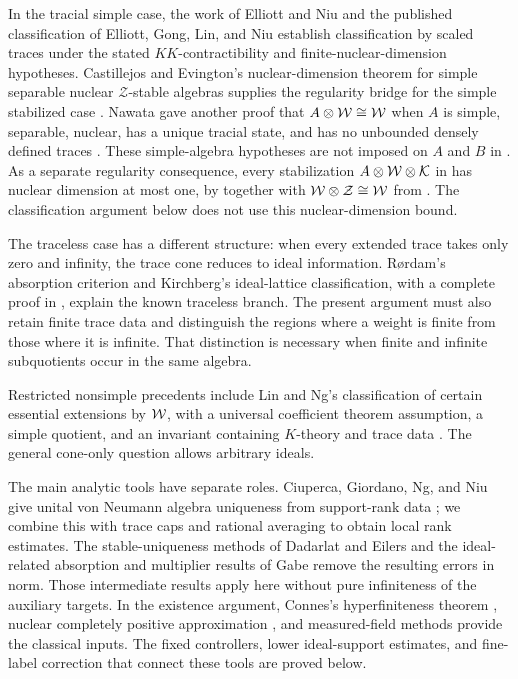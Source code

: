 In the tracial simple case, the work of Elliott and Niu \cite{ElliottNiu}
and the published classification of Elliott, Gong, Lin, and Niu
\cite[Theorem~7.5]{EGLN} establish classification by scaled traces
under the stated $KK$-contractibility and finite-nuclear-dimension
hypotheses. Castillejos and Evington's nuclear-dimension theorem for
simple separable nuclear $\mathcal Z$-stable algebras supplies the
regularity bridge for the simple stabilized case
\cite[Theorem~A]{CastillejosEvington}. Nawata gave another proof that
$A\otimes\mathcal W\cong\mathcal W$ when $A$ is simple, separable, nuclear, has a
unique tracial state, and has no unbounded densely defined traces
\cite[Corollary~6.2(i)]{Nawata}. These simple-algebra hypotheses are
not imposed on $A$ and $B$ in .
As a separate regularity consequence, every stabilization
$A\otimes\mathcal W\otimes\mathcal K$ in  has
nuclear dimension at most one, by \cite[Theorem~1.3]{OpenAINuclearDimension}
together with $\mathcal W\otimes\mathcal Z\cong\mathcal W$ from
\cite[Corollary~6.3]{Jacelon}.
The classification argument below does not use this nuclear-dimension
bound.

The traceless case has a different structure: when every extended
trace takes only zero and infinity, the trace cone reduces to ideal
information. R\o rdam's absorption criterion
\cite[Theorem~5.2]{RordamZ} and Kirchberg's ideal-lattice classification,
with a complete proof in \cite[Theorem~6.13]{GabeO2}, explain the known
traceless branch. The present argument must also retain finite trace
data and distinguish the regions where a weight is finite from those
where it is infinite. That distinction is necessary when finite and
infinite subquotients occur in the same algebra.

Restricted nonsimple precedents include Lin and Ng's classification
of certain essential extensions by $\mathcal W$, with a universal coefficient
theorem assumption, a simple quotient, and an invariant containing
$K$-theory and trace data \cite[Theorem~9.6]{LinNg}.
The general cone-only question allows arbitrary ideals.

The main analytic tools have separate roles. Ciuperca, Giordano, Ng,
and Niu give unital von Neumann algebra uniqueness from support-rank data
\cite{CGNN}; we combine this with trace caps and rational averaging to
obtain local rank estimates. The stable-uniqueness methods of
Dadarlat and Eilers \cite{DadarlatEilers} and the ideal-related
absorption and multiplier results of Gabe
\cite[Sections~11--13]{Gabe} remove the resulting errors in norm.
Those intermediate results apply here without pure infiniteness of
the auxiliary targets. In the existence argument, Connes's
hyperfiniteness theorem \cite{Connes}, nuclear completely positive
approximation \cite{ChoiEffros}, and measured-field methods
\cite{VaesWouters} provide the classical inputs. The fixed controllers,
lower ideal-support estimates, and fine-label correction that connect
these tools are proved below.

